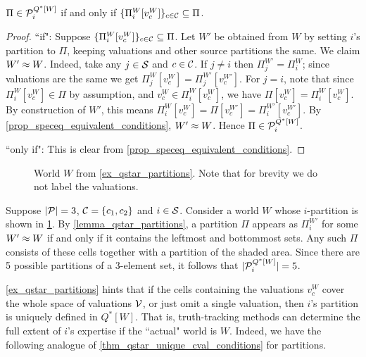 \begin{lemma}
    \label{lemma_qstar_partitions}
    $\Pi \in \mathcal{P}^{Q^*[W]}_i$
    if and only if
    $\{\Pi^W_i[v^W_c]\}_{c \in \mathcal{C}} \subseteq \Pi$.
\end{lemma}

\begin{proof}

    ``if": Suppose $\{\Pi^W_i[v^W_c]\}_{c \in \mathcal{C}} \subseteq \Pi$. Let $W'$ be
    obtained from $W$ by setting $i$'s partition to $\Pi$, keeping valuations
    and other source partitions the same. We claim $W' \approx W$. Indeed, take
    any $j \in \mathcal{S}$ and $c \in \mathcal{C}$. If $j \ne i$ then $\Pi^{W'}_j =
    \Pi^W_i$; since valuations are the same we get $\Pi^W_j[v^W_c] =
    \Pi^{W'}_j[v^{W'}_c]$. For $j = i$, note that since $\Pi^W_i[v^W_c] \in
    \Pi$ by assumption, and $v^W_c \in \Pi^W_i[v^W_c]$, we have $\Pi[v^W_c] =
    \Pi^W_i[v^W_c]$. By construction of $W'$, this means $\Pi^W_i[v^W_c] =
    \Pi[v^{W'}_c] = \Pi^{W'}_i[v^{W'}_c]$. By
    \cref{prop_speceq_equivalent_conditions},
    $W' \approx W$. Hence $\Pi \in \mathcal{P}^{Q^*[W]}_i$.

    ``only if": This is clear from \cref{prop_speceq_equivalent_conditions}.
\end{proof}

\begin{figure}
    \centering
    
    \caption{
        World $W$ from \cref{ex_qstar_partitions}. Note that for brevity we do
        not label the valuations.
    }
    \label{fig_qstar_partitions}
\end{figure}

\begin{example}
    \label{ex_qstar_partitions}
    Suppose $|\mathcal{P}| = 3$, $\mathcal{C} = \{c_1, c_2\}$ and $i \in \mathcal{S}$.
    Consider a world $W$ whose $i$-partition is shown in
    \cref{fig_qstar_partitions}. By \cref{lemma_qstar_partitions}, a partition
    $\Pi$ appears as $\Pi^{W'}_i$ for some $W' \approx W$ if and only if it
    contains the leftmost and bottommost sets. Any such $\Pi$ consists
    of these cells together with a partition of the shaded area. Since there
    are 5 possible partitions of a 3-element set, it follows that
    $|\mathcal{P}^{Q^*[W]}_i| = 5$.
\end{example}

\cref{ex_qstar_partitions} hints that if the cells containing the valuations
$v^W_c$ cover the whole space of valuations $\mathcal{V}$, or just omit a single
valuation, then $i$'s partition is uniquely defined in $Q^*[W]$. That is,
truth-tracking methods can determine the full extent of $i$'s expertise if the
``actual" world is $W$. Indeed, we have the following analogue of
\cref{thm_qstar_unique_cval_conditions} for partitions.

